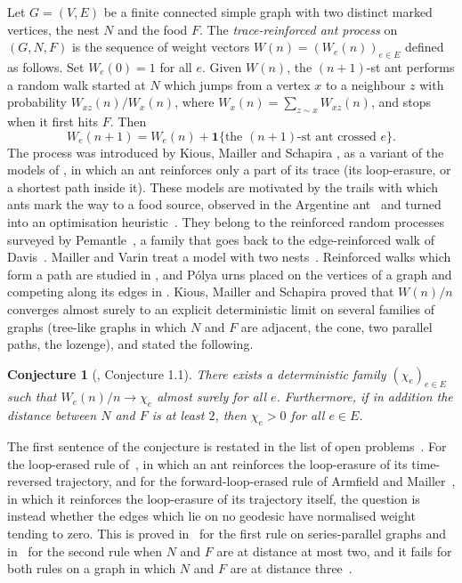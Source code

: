 \documentclass[11pt]{amsart}
\newtheorem{conjecture}[theorem]{Conjecture}
\theoremstyle{remark}
\newcommand{\one}{\mathbf{1}}
\begin{document}
Let $G=(V,E)$ be a finite connected simple graph with two distinct marked vertices, the nest $N$ and the food $F$.
The \emph{trace-reinforced ant process} on $(G,N,F)$ is the sequence of weight vectors $W(n)=(W_e(n))_{e\in E}$
defined as follows. Set $W_e(0)=1$ for all $e$. Given $W(n)$, the $(n+1)$-st ant performs a random walk started at
$N$ which jumps from a vertex $x$ to a neighbour $z$ with probability $W_{xz}(n)/W_x(n)$, where
$W_x(n)=\sum_{z\sim x}W_{xz}(n)$, and stops when it first hits $F$. Then
\[
W_e(n+1)=W_e(n)+\one\{\text{the $(n+1)$-st ant crossed $e$}\}.
\]
The process was introduced by Kious, Mailler and Schapira \cite{KMS}, as a variant of the models of \cite{KMS0}, in
which an ant reinforces only a part of its trace (its loop-erasure, or a shortest path inside it). These models
are motivated by the trails with which ants mark the way to a food source, observed in the Argentine ant~\cite{Den}
and turned into an optimisation heuristic~\cite{DS}. They belong to the reinforced random processes surveyed by
Pemantle~\cite{Pem07}, a family that goes back to the edge-reinforced walk of Davis~\cite{Dav}. Mailler and Varin
treat a model with two nests~\cite{MV}. Reinforced walks which form a path are studied in \cite{LGR,EFR}, and
P\'olya urns placed on the vertices of a graph and competing along its edges in \cite{HHKR}. Kious, Mailler
and Schapira proved that $W(n)/n$ converges almost surely to an explicit
deterministic limit on several families of graphs (tree-like graphs in which $N$ and $F$ are adjacent, the cone, two
parallel paths, the lozenge), and stated the following.

\begin{conjecture}[\cite{KMS}, Conjecture 1.1]\label{conj:kms}
There exists a deterministic family $(\chi_e)_{e\in E}$ such that $W_e(n)/n\to\chi_e$ almost surely for all $e$.
Furthermore, if in addition the distance between $N$ and $F$ is at least $2$, then $\chi_e>0$ for all $e\in E$.
\end{conjecture}

The first sentence of the conjecture is restated in the list of open problems~\cite[Section~2]{Aletti}. For the
loop-erased rule of~\cite{KMS0}, in which an ant reinforces the loop-erasure of its time-reversed trajectory, and
for the forward-loop-erased rule of Armfield and Mailler~\cite{AM}, in which it reinforces the loop-erasure of its
trajectory itself, the question is instead whether the edges which lie on no geodesic have normalised weight tending
to zero. This is proved in~\cite{KMS0} for the first rule on series-parallel graphs and in~\cite{AM} for the second
rule when $N$ and $F$ are at distance at most two, and it fails for both rules on a graph in which $N$ and $F$ are at
distance three~\cite{ShmaloLE}.
\end{document}
